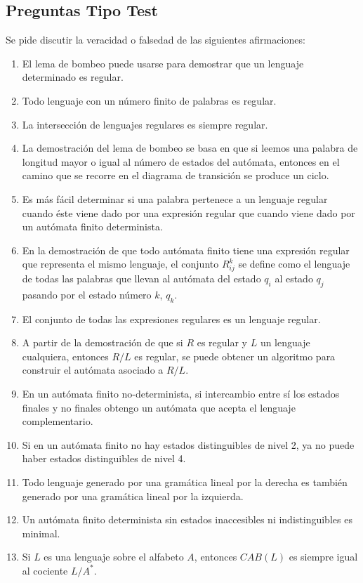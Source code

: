 \subsection{Preguntas Tipo Test}
Se pide discutir la veracidad o falsedad de las siguientes afirmaciones:
\begin{enumerate}
    \item El lema de bombeo puede usarse para demostrar que un lenguaje determinado es regular.
    \item Todo lenguaje con un número finito de palabras es regular.
    \item La intersección de lenguajes regulares es siempre regular.
    \item La demostración del lema de bombeo se basa en que si leemos una palabra de longitud mayor o igual al número de estados del autómata, entonces en el camino que se recorre en el diagrama de transición se produce un ciclo.
    \item Es más fácil determinar si una palabra pertenece a un lenguaje regular cuando éste viene dado por una expresión regular que cuando viene dado por un autómata finito determinista.
    \item En la demostración de que todo autómata finito tiene una expresión regular que representa el mismo lenguaje, el conjunto $R^k_{ij}$ se define como el lenguaje de todas las palabras que llevan al autómata del estado $q_i$ al estado $q_j$ pasando por el estado número $k$, $q_k$.
    \item El conjunto de todas las expresiones regulares es un lenguaje regular.
    \item A partir de la demostración de que si $R$ es regular y $L$ un lenguaje cualquiera, entonces $R/L$ es regular, se puede obtener un algoritmo para construir el autómata asociado a $R/L$.
    \item En un autómata finito no-determinista, si intercambio entre sí los estados finales y no finales obtengo un autómata que acepta el lenguaje complementario.
    \item Si en un autómata finito no hay estados distinguibles de nivel 2, ya no puede haber estados distinguibles de nivel 4.
    \item Todo lenguaje generado por una gramática lineal por la derecha es también generado por una gramática lineal por la izquierda.
    \item Un autómata finito determinista sin estados inaccesibles ni indistinguibles es minimal.
    \item Si $L$ es una lenguaje sobre el alfabeto $A$, entonces $CAB(L)$ es siempre igual al cociente $L/A^\ast$.

\end{enumerate}
